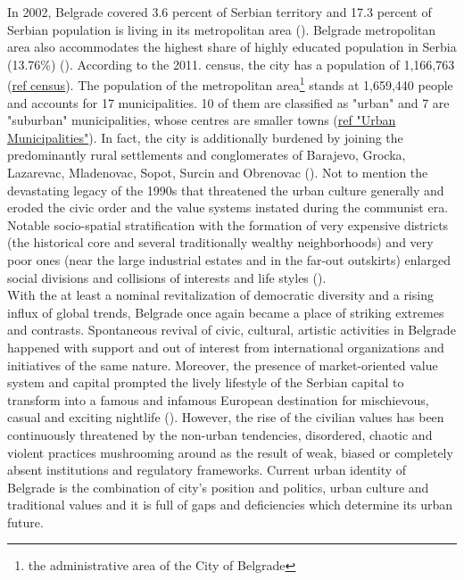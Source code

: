 \documentclass[11pt]{report}
\begin{document}
In 2002, Belgrade covered 3.6 percent of Serbian territory and 17.3 percent of Serbian population is living in its metropolitan area (\cite{Cities in Transition 2013}).
Belgrade metropolitan area also accommodates the highest share of highly educated population in Serbia (13.76\%) (\href{}{\citealt{vukmirovic_city_2013}}).
According to the 2011. census, the city has a population of 1,166,763 (\href{}{ref census}).
The population of the metropolitan area\footnote{the administrative area of the City of Belgrade}                 
stands at 1,659,440 people and accounts for 17 municipalities.
10 of them are classified as "urban" and 7 are "suburban" municipalities, whose centres are smaller towns (\href{}{ref "Urban Municipalities"}).
In fact, the  city  is additionally burdened by joining the predominantly rural  settlements  and  conglomerates  of Barajevo, Grocka,  Lazarevac,  Mladenovac,  Sopot,  Surcin  and Obrenovac (\href{}{\citealt{doytchinov_belgrade_2015}}).
Not to mention the devastating legacy of the 1990s that threatened the  urban  culture generally and eroded the civic order and the value systems instated during the communist era.
Notable socio-spatial stratification with the formation of very expensive districts (the historical core and several traditionally wealthy neighborhoods) and very poor ones (near the large industrial estates and in the far-out outskirts) enlarged social divisions and collisions of interests and life styles (\href{}{\citealt{hirt_belgrade_2009}}).
\\

With the at least a nominal revitalization of democratic diversity and a rising influx of global trends, Belgrade once again became a place of striking extremes and contrasts. 
Spontaneous revival of civic, cultural, artistic activities in Belgrade happened with support and out of interest from international organizations and initiatives of the same nature.
Moreover, the presence of market-oriented value system and capital prompted the lively lifestyle of the Serbian capital to transform into a famous and infamous European destination for mischievous, casual and exciting nightlife (\href{}{\citealt{doytchinov_urban_2015}}).
However, the rise of the civilian values has been continuously threatened by the non-urban tendencies, disordered, chaotic  and violent practices mushrooming around as the result of weak, biased or completely absent institutions and regulatory frameworks.
Current urban identity of Belgrade is the combination of city's position and politics, urban culture and traditional values and it is full of gaps and deficiencies which determine its urban future.
\\
\end{document}
